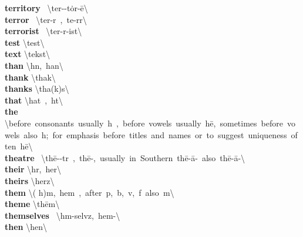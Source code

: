\documentclass[10pt,a4paper]{article}
\begin{document}
\begin{multicols}{2}
\textbf{ territory }\quad \ \textbackslash \textprimstress ter-\textschwa -\textsecstress t\.{o}r-\={e}\textbackslash \\
\textbf{ terror }\quad \ \textbackslash \textprimstress ter-\textschwa r\ ,\ \textprimstress te-r\textschwa r\textbackslash \\
\textbf{ terrorist }\quad \ \textbackslash \textprimstress ter-\textschwa r-ist\textbackslash \\
\textbf{ test }\quad \textbackslash \textprimstress test\textbackslash \\
\textbf{ text }\quad \textbackslash \textprimstress tekst\textbackslash \\
\textbf{ than }\quad \textbackslash  h\textschwa n,\ \textprimstress  han\textbackslash \\
\textbf{ thank }\quad \textbackslash \textprimstress tha\engma k\textbackslash \\
\textbf{ thanks }\quad \textbackslash \textprimstress tha\engma (k)s\textbackslash \\
\textbf{ that }\quad \textbackslash \textprimstress  hat\ ,\  h\textschwa t\textbackslash \\
\textbf{ the }\quad \textbackslash before\ consonants\ usually\  h\textschwa \ ,\ before\ vowels\ usually\  h\={e},\ sometimes\ before\ vowels\ also\  h\textschwa ;\ for\ emphasis\ before\ titles\ and\ names\ or\ to\ suggest\ uniqueness\ often\ \textprimstress  h\={e}\textbackslash \\
\textbf{ theatre }\quad \ \textbackslash \textprimstress th\={e}-\textschwa -t\textschwa r\ ,\ \textprimstress th\={e}\textschwa -,\ usually\ in\ Southern\ \textprimstress th\={e}-\textsecstress \={a}-\ also\ th\={e}-\textprimstress \={a}-\textbackslash \\
\textbf{ their }\quad \textbackslash  h\textschwa r,\ \textprimstress  her\textbackslash \\
\textbf{ theirs }\quad \textbackslash \textprimstress  herz\textbackslash \\
\textbf{ them }\quad \textbackslash ( h)\textschwa m,\ \textprimstress  hem\ ,\ after\ p,\ b,\ v,\ f\ also\ \textsuperscript{\textreve}m\textbackslash \\
\textbf{ theme }\quad \textbackslash \textprimstress th\={e}m\textbackslash \\
\textbf{ themselves }\quad \ \textbackslash  h\textschwa m-\textprimstress selvz,\  hem-\textbackslash \\
\textbf{ then }\quad \textbackslash \textprimstress  hen\textbackslash \\

\end{multicols}
\end{document}
